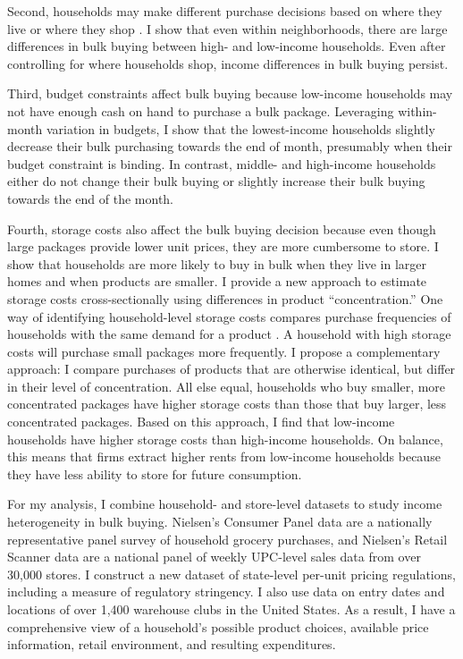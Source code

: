 \documentclass[AER]{AEA_mal}
\begin{document}
Second, households may make different purchase decisions based on where they live or where they shop \citep{chung1999, talukdar2008, handbury2019}. I show that even within neighborhoods, there are large differences in bulk buying between high- and low-income households. Even after controlling for where households shop, income differences in bulk buying persist.

Third, budget constraints affect bulk buying because low-income households may not have enough cash on hand to purchase a bulk package. Leveraging within-month variation in budgets, I show that the lowest-income households slightly decrease their bulk purchasing towards the end of month, presumably when their budget constraint is binding. In contrast, middle- and high-income households either do not change their bulk buying or slightly increase their bulk buying towards the end of the month.

Fourth, storage costs also affect the bulk buying decision because even though large packages provide lower unit prices, they are more cumbersome to store. I show that households are more likely to buy in bulk when they live in larger homes and when products are smaller. I provide a new approach to estimate storage costs cross-sectionally using differences in product ``concentration.'' One way of identifying household-level storage costs compares purchase frequencies of households with the same demand for a product \citep{hendel2006a}. A household with high storage costs will purchase small packages more frequently. I propose a complementary approach: I compare purchases of products that are otherwise identical, but differ in their level of concentration. All else equal, households who buy smaller, more concentrated packages have higher storage costs than those that buy larger, less concentrated packages. Based on this approach, I find that low-income households have higher storage costs than high-income households. On balance, this means that firms extract higher rents from low-income households because they have less ability to store for future consumption.

For my analysis, I combine household- and store-level datasets to study income heterogeneity in bulk buying. Nielsen's Consumer Panel data are a nationally representative panel survey of household grocery purchases, and Nielsen's Retail Scanner data are a national panel of weekly UPC-level sales data from over 30,000 stores. I construct a new dataset of state-level per-unit pricing regulations, including a measure of regulatory stringency. I also use data on entry dates and locations of over 1,400 warehouse clubs in the United States. As a result, I have a comprehensive view of a household's possible product choices, available price information, retail environment, and resulting expenditures.
\end{document}
